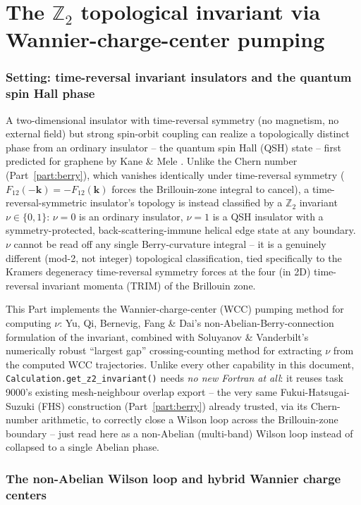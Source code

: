 \documentclass[11pt]{article}
\begin{document}
\part{The $\mathbb Z_2$ topological invariant via Wannier-charge-center pumping}
\label{part:z2}

\section{Setting: time-reversal invariant insulators and the quantum spin Hall phase}

A two-dimensional insulator with time-reversal symmetry (no magnetism, no external
field) but strong spin-orbit coupling can realize a topologically distinct phase from an
ordinary insulator -- the quantum spin Hall (QSH) state -- first predicted for graphene
by Kane \& Mele \cite{kanemele2005}. Unlike the Chern number
(Part~\ref{part:berry}), which vanishes identically under time-reversal symmetry
($F_{12}(-\mathbf k)=-F_{12}(\mathbf k)$ forces the Brillouin-zone integral to cancel), a
time-reversal-symmetric insulator's topology is instead classified by a $\mathbb Z_2$
invariant $\nu\in\{0,1\}$: $\nu=0$ is an ordinary insulator, $\nu=1$ is a QSH insulator
with a symmetry-protected, back-scattering-immune helical edge state at any boundary.
$\nu$ cannot be read off any single Berry-curvature integral -- it is a genuinely
different (mod-2, not integer) topological classification, tied specifically to the
Kramers degeneracy time-reversal symmetry forces at the four (in 2D) time-reversal
invariant momenta (TRIM) of the Brillouin zone.

This Part implements the Wannier-charge-center (WCC) pumping method for computing
$\nu$: Yu, Qi, Bernevig, Fang \& Dai's non-Abelian-Berry-connection formulation
\cite{yu2011} of the invariant, combined with Soluyanov \& Vanderbilt's numerically
robust ``largest gap'' crossing-counting method \cite{soluyanov2011} for extracting
$\nu$ from the computed WCC trajectories. Unlike every other capability in this
document, \texttt{Calculation.get\_z2\_invariant()} needs \emph{no new Fortran at all}:
it reuses task 9000's existing mesh-neighbour overlap export -- the very same
Fukui-Hatsugai-Suzuki (FHS) construction (Part~\ref{part:berry}) already trusted, via
its Chern-number arithmetic, to correctly close a Wilson loop across the
Brillouin-zone boundary -- just read here as a non-Abelian (multi-band) Wilson loop
instead of collapsed to a single Abelian phase.

\section{The non-Abelian Wilson loop and hybrid Wannier charge centers}
\end{document}
